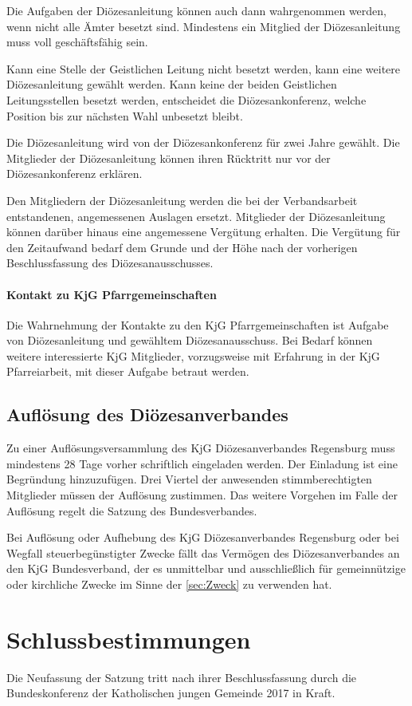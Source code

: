 \documentclass[12pt]{report}
\begin{document}
\begin{flushleft}
Die Aufgaben der Diözesanleitung können auch dann wahrgenommen werden, wenn nicht alle
Ämter besetzt sind. Mindestens ein Mitglied der Diözesanleitung muss voll geschäftsfähig sein.

Kann eine Stelle der Geistlichen Leitung nicht besetzt werden, kann eine weitere Diözesanleitung
gewählt werden. Kann keine der beiden Geistlichen Leitungsstellen besetzt werden, entscheidet
die Diözesankonferenz, welche Position bis zur nächsten Wahl unbesetzt bleibt.

Die Diözesanleitung wird von der Diözesankonferenz für zwei Jahre gewählt. Die Mitglieder der
Diözesanleitung können ihren Rücktritt nur vor der Diözesankonferenz erklären.

Den Mitgliedern der Diözesanleitung werden die bei der Verbandsarbeit entstandenen, angemessenen Auslagen
ersetzt. Mitglieder der Diözesanleitung können darüber hinaus eine angemessene Vergütung erhalten.
Die Vergütung für den Zeitaufwand bedarf dem Grunde und der Höhe nach der vorherigen Beschlussfassung
des Diözesanausschusses.

\subsubsection{Kontakt zu KjG Pfarrgemeinschaften}
Die Wahrnehmung der Kontakte zu den KjG Pfarrgemeinschaften ist Aufgabe von Diözesanleitung
und gewähltem Diözesanausschuss. Bei Bedarf können weitere interessierte KjG Mitglieder,
vorzugsweise mit Erfahrung in der KjG Pfarreiarbeit, mit dieser Aufgabe betraut werden.

\section{Auflösung des Diözesanverbandes}
Zu einer Auflösungsversammlung des KjG Diözesanverbandes Regensburg muss mindestens 28 Tage vorher
schriftlich eingeladen werden. Der Einladung ist eine Begründung hinzuzufügen. Drei Viertel der
anwesenden stimmberechtigten Mitglieder müssen der Auflösung zustimmen. Das weitere Vorgehen
im Falle der Auflösung regelt die Satzung des Bundesverbandes.

Bei Auflösung oder Aufhebung des KjG Diözesanverbandes Regensburg oder bei Wegfall steuerbegünstigter
Zwecke fällt das Vermögen des Diözesanverbandes an den KjG Bundesverband, der es unmittelbar und
ausschließlich für gemeinnützige oder kirchliche Zwecke im Sinne der \ref{sec:Zweck} zu verwenden hat.
\chapter{Schlussbestimmungen}
Die Neufassung der Satzung tritt nach ihrer Beschlussfassung durch die Bundeskonferenz der
Katholischen jungen Gemeinde 2017 in Kraft.





\end{flushleft}
\end{document}
